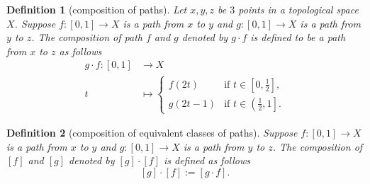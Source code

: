 \documentclass{report}
\newtheorem{definition}{Definition}[section]
\theoremstyle{nonumberplain}
\begin{document}
\begin{definition}[composition of paths]
	Let $x,y,z$ be $3$ points in a topological space $X$. Suppose $f: [0,1] \longrightarrow X$ is a path from $x$ to $y$ and $g: [0,1] \longrightarrow X$ is a path from $y$ to $z$. The \emph{composition of path $f$ and $g$} denoted by $g\cdot f$ is defined to be a path from $x$ to $z$ as follows
	\begin{align*}
		g\cdot f:[0,1] &\longrightarrow X\\
		t &\longmapsto \begin{cases}
			f(2t)&\text{if }t\in\left[0,\frac{1}{2}\right],\\
			g(2t-1)&\text{if }t\in\left(\left.\frac{1}{2},1\right]\right. .
		\end{cases}
	\end{align*}
\end{definition}
\begin{definition}[composition of equivalent classes of paths]
	Suppose $f: [0,1] \longrightarrow X$ is a path from $x$ to $y$ and $g: [0,1] \longrightarrow X$ is a path from $y$ to $z$. The \emph{composition of $[f]$ and $[g]$} denoted by $[g]\cdot [f]$ is defined as follows
	\[
		[g]\cdot [f]:=[g\cdot f].
	\]
\end{definition}
\end{document}
